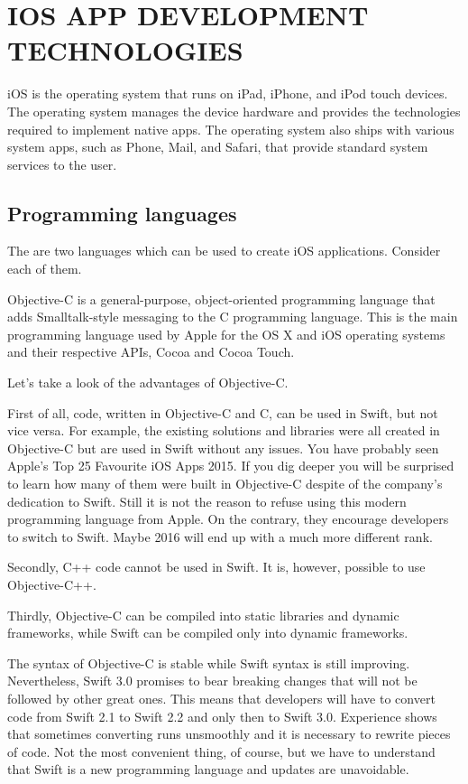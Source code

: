 \section[iOS app development technologies]
{IOS APP DEVELOPMENT TECHNOLOGIES}

iOS is the operating system that runs on iPad, iPhone, and iPod touch devices.
The operating system manages the device hardware and provides the technologies
required to implement native apps. The operating system also ships with
various system apps, such as Phone, Mail, and Safari, that provide standard
system services to the user.


\subsection{Programming languages}

The are two languages which can be used to create iOS applications.
Consider each of them.

Objective-C is a general-purpose, object-oriented programming language that adds
Smalltalk-style messaging to the C programming language. This is the main
programming language used by Apple for the OS X and iOS operating systems
and their respective APIs, Cocoa and Cocoa Touch.

Let's take a look of the advantages of Objective-C.

First of all, code, written in Objective-C and C, can be used in Swift,
but not vice versa. For example, the existing solutions and libraries
were all created in Objective-C but are used in Swift without any issues.
You have probably seen Apple’s Top 25 Favourite iOS Apps 2015. If you dig deeper
you will be surprised to learn how many of them were built in Objective-C
despite of the company’s dedication to Swift. Still it is not the reason
to refuse using this modern programming language from Apple.
On the contrary, they encourage developers to switch to Swift.
Maybe 2016 will end up with a much more different rank.

Secondly, C++ code cannot be used in Swift. It is, however, possible to use Objective-C++.

Thirdly, Objective-C can be compiled into static libraries and dynamic frameworks,
while Swift can be compiled only into dynamic frameworks.

The syntax of Objective-C is stable while Swift syntax is still improving.
Nevertheless, Swift 3.0 promises to bear breaking changes that will not be followed
by other great ones. This means that developers will have to convert code
from Swift 2.1 to Swift 2.2 and only then to Swift 3.0. Experience shows that
sometimes converting runs unsmoothly and it is necessary to rewrite pieces of code.
Not the most convenient thing, of course, but we have to understand that Swift
is a new programming language and updates are unavoidable.

